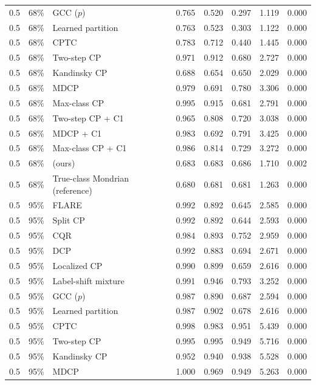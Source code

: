 \begin{longtable}{llp{4cm}ccccc}
0.5 & 68\% & GCC ($p$) & 0.765 & 0.520 & 0.297 & 1.119 & 0.000 \\
0.5 & 68\% & Learned partition & 0.763 & 0.523 & 0.303 & 1.122 & 0.000 \\
0.5 & 68\% & CPTC & 0.783 & 0.712 & 0.440 & 1.445 & 0.000 \\
0.5 & 68\% & Two-step CP & 0.971 & 0.912 & 0.680 & 2.727 & 0.000 \\
0.5 & 68\% & Kandinsky CP & 0.688 & 0.654 & 0.650 & 2.029 & 0.000 \\
0.5 & 68\% & MDCP & 0.979 & 0.691 & 0.780 & 3.306 & 0.000 \\
0.5 & 68\% & Max-class CP & 0.995 & 0.915 & 0.681 & 2.791 & 0.000 \\
0.5 & 68\% & Two-step CP + C1 & 0.965 & 0.808 & 0.720 & 3.038 & 0.000 \\
0.5 & 68\% & MDCP + C1 & 0.983 & 0.692 & 0.791 & 3.425 & 0.000 \\
0.5 & 68\% & Max-class CP + C1 & 0.986 & 0.814 & 0.729 & 3.272 & 0.000 \\
0.5 & 68\% & \gamut{} (ours) & 0.683 & 0.683 & 0.686 & 1.710 & 0.002 \\
0.5 & 68\% & True-class Mondrian (reference) & 0.680 & 0.681 & 0.681 & 1.263 & 0.000 \\
\midrule
0.5 & 95\% & FLARE & 0.992 & 0.892 & 0.645 & 2.585 & 0.000 \\
0.5 & 95\% & Split CP & 0.992 & 0.892 & 0.644 & 2.593 & 0.000 \\
0.5 & 95\% & CQR & 0.984 & 0.893 & 0.752 & 2.959 & 0.000 \\
0.5 & 95\% & DCP & 0.992 & 0.883 & 0.694 & 2.671 & 0.000 \\
0.5 & 95\% & Localized CP & 0.990 & 0.899 & 0.659 & 2.616 & 0.000 \\
0.5 & 95\% & Label-shift mixture & 0.991 & 0.946 & 0.793 & 3.252 & 0.000 \\
0.5 & 95\% & GCC ($p$) & 0.987 & 0.890 & 0.687 & 2.594 & 0.000 \\
0.5 & 95\% & Learned partition & 0.987 & 0.902 & 0.678 & 2.616 & 0.000 \\
0.5 & 95\% & CPTC & 0.998 & 0.983 & 0.951 & 5.439 & 0.000 \\
0.5 & 95\% & Two-step CP & 0.995 & 0.995 & 0.949 & 5.716 & 0.000 \\
0.5 & 95\% & Kandinsky CP & 0.952 & 0.940 & 0.938 & 5.528 & 0.000 \\
0.5 & 95\% & MDCP & 1.000 & 0.969 & 0.949 & 5.263 & 0.000 \\

\end{longtable}
